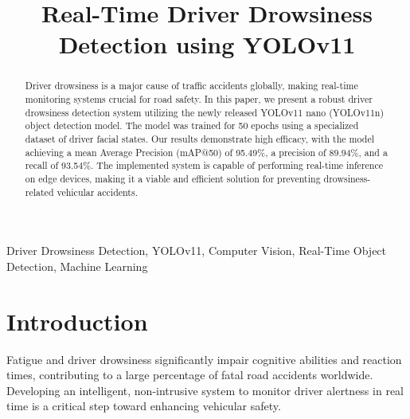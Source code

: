 \documentclass[conference]{IEEEtran}
\begin{document}
\title{Real-Time Driver Drowsiness Detection using YOLOv11}

\author{
\and
{}
}

\maketitle

\begin{abstract}
Driver drowsiness is a major cause of traffic accidents globally, making real-time monitoring systems crucial for road safety. In this paper, we present a robust driver drowsiness detection system utilizing the newly released YOLOv11 nano (YOLOv11n) object detection model. The model was trained for 50 epochs using a specialized dataset of driver facial states. Our results demonstrate high efficacy, with the model achieving a mean Average Precision (mAP@50) of 95.49\%, a precision of 89.94\%, and a recall of 93.54\%. The implemented system is capable of performing real-time inference on edge devices, making it a viable and efficient solution for preventing drowsiness-related vehicular accidents.
\end{abstract}

\begin{IEEEkeywords}
Driver Drowsiness Detection, YOLOv11, Computer Vision, Real-Time Object Detection, Machine Learning
\end{IEEEkeywords}

\section{Introduction}
Fatigue and driver drowsiness significantly impair cognitive abilities and reaction times, contributing to a large percentage of fatal road accidents worldwide. Developing an intelligent, non-intrusive system to monitor driver alertness in real time is a critical step toward enhancing vehicular safety. 
\end{document}
